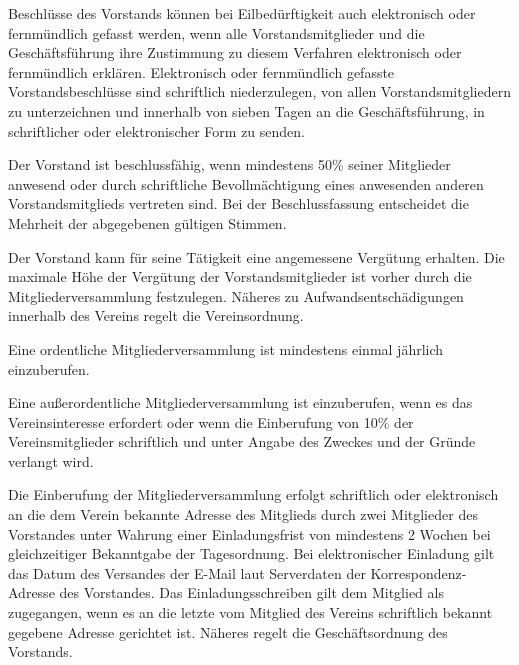 \begin{contract}
    Beschlüsse des Vorstands können bei Eilbedürftigkeit auch elektronisch oder fernmündlich gefasst werden, wenn alle Vorstandsmitglieder und die Geschäftsführung ihre Zustimmung zu diesem Verfahren elektronisch oder fernmündlich erklären. Elektronisch oder fernmündlich gefasste Vorstandsbeschlüsse sind schriftlich niederzulegen, von allen Vorstandsmitgliedern zu unterzeichnen und innerhalb von sieben Tagen an die Geschäftsführung, in schriftlicher oder elektronischer Form zu senden.

    Der Vorstand ist beschlussfähig, wenn mindestens 50\% seiner Mitglieder anwesend oder durch schriftliche Bevollmächtigung eines anwesenden anderen Vorstandsmitglieds vertreten sind. Bei der Beschlussfassung entscheidet die Mehrheit der abgegebenen gültigen Stimmen.

    Der Vorstand kann für seine Tätigkeit eine angemessene Vergütung erhalten. Die maximale Höhe der Vergütung der Vorstandsmitglieder ist vorher durch die Mitgliederversammlung festzulegen. Näheres zu Aufwandsentschädigungen innerhalb des Vereins regelt die Vereinsordnung.

    Eine ordentliche Mitgliederversammlung ist mindestens einmal jährlich einzuberufen.

    Eine außerordentliche Mitgliederversammlung ist einzuberufen, wenn es das Vereinsinteresse erfordert oder wenn die Einberufung von 10\% der Vereinsmitglieder schriftlich und unter Angabe des Zweckes und der Gründe verlangt wird.

    Die Einberufung der Mitgliederversammlung erfolgt schriftlich oder elektronisch an die dem Verein bekannte Adresse des Mitglieds durch zwei Mitglieder des Vorstandes unter Wahrung einer Einladungsfrist von mindestens 2 Wochen bei gleichzeitiger Bekanntgabe der Tagesordnung. Bei elektronischer Einladung gilt das Datum des Versandes der E-Mail laut Serverdaten der Korrespondenz-Adresse des Vorstandes. Das Einladungsschreiben gilt dem Mitglied als zugegangen, wenn es an die letzte vom Mitglied des Vereins schriftlich bekannt gegebene Adresse gerichtet ist. Näheres regelt die Geschäftsordnung des Vorstands.


\end{contract}
